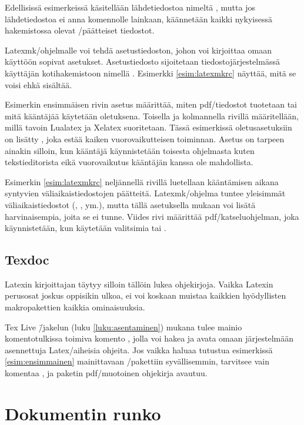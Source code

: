 Edellisissä esimerkeissä käsitellään lähdetiedostoa nimeltä
, mutta jos lähdetiedostoa ei anna komennolle
lainkaan, käännetään kaikki nykyisessä hakemistossa olevat
\-/päätteiset tiedostot.

Latexmk\-/ohjelmalle voi tehdä asetustiedoston, johon voi kirjoittaa
omaan käyttöön sopivat asetukset. Asetustiedosto sijoitetaan
tiedostojärjestelmässä käyttäjän kotihakemistoon nimellä
. Esimerkki \ref{esim:latexmkrc} näyttää, mitä se
voisi ehkä sisältää.

Esimerkin ensimmäisen rivin asetus määrittää, miten pdf\-/tiedostot
tuotetaan tai mitä kääntäjää käytetään oletuksena. Toisella ja
kolmannella rivillä määritellään, millä tavoin Lualatex ja Xelatex
suoritetaan. Tässä esimerkissä ole\-tus\-ase\-tuk\-siin on lisätty
, joka estää kaiken vuorovaikutteisen toiminnan.
Asetus on tarpeen ainakin silloin, kun kääntäjä käynnistetään toisesta
ohjelmasta kuten tekstieditorista eikä vuorovaikutus kääntäjän kanssa
ole mahdollista.



Esimerkin \ref{esim:latexmkrc} neljännellä rivillä luetellaan
kääntämisen aikana syntyvien väliaikaistiedostojen päätteitä.
Latexmk\-/ohjelma tuntee yleisimmät väliaikaistiedostot (,
,  ym.), mutta tällä asetuksella mukaan voi lisätä
harvinaisempia, joita se ei tunne. Viides rivi määrittää
pdf\-/katseluohjelman, joka käynnistetään, kun käytetään valitsimia
 tai .

\subsection{Texdoc}

Latexin kirjoittajan täytyy silloin tällöin lukea ohjekirjoja. Vaikka
Latexin perusosat joskus oppisikin ulkoa, ei voi koskaan muistaa
kaikkien hyödyllisten makropakettien kaikkia ominaisuuksia.

Tex Live \=/jakelun (luku \ref{luku:asentaminen}) mukana tulee mainio
komentotulkissa toimiva komento , jolla voi hakea ja avata
omaan järjestelmään asennettuja Latex\-/aiheisia ohjeita. Jos vaikka
haluaa tutustua esimerkissä \ref{esim:ensimmainen} mainittavaan
\-/pakettiin syvällisemmin, tarvitsee vain komentaa
, ja paketin pdf\-/muotoinen ohjekirja avautuu.

\section{Dokumentin runko}

